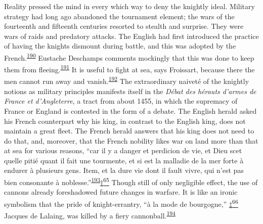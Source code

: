 Reality pressed the mind in every which way to deny the knightly ideal.
Military strategy had long ago abandoned the tournament element; the
wars of the fourteenth and fifteenth centuries resorted to stealth and
surprise. They were wars of raids and predatory attacks. The English had
first introduced the practice of having the knights dismount during
battle, and this was adopted by the
French.\textsuperscript{\protect\hypertarget{10_Chapter_Three__THE_HEROIC_DREAM.xhtmlux5cux23id_1557}{\protect\hyperlink{23_NOTES.xhtmlux5cux23id_1558}{190}}}
Eustache Deschamps comments mockingly that this was done to keep them
from
fleeing.\textsuperscript{\protect\hypertarget{10_Chapter_Three__THE_HEROIC_DREAM.xhtmlux5cux23id_1555}{\protect\hyperlink{23_NOTES.xhtmlux5cux23id_1556}{191}}}
It is useful to fight at sea, says Froissart, because there the men
cannot run away and
vanish.\textsuperscript{\protect\hypertarget{10_Chapter_Three__THE_HEROIC_DREAM.xhtmlux5cux23id_1553}{\protect\hyperlink{23_NOTES.xhtmlux5cux23id_1554}{192}}}
The extraordinary naiveté of the knightly notions as military principles
manifests itself in the \emph{Débat des hérauts d'armes de France et
d'Angleterre}, a tract from about 1455, in which the supremacy of France
or England is contested in the form of a debate. The English herald
asked his French counterpart why his king, in contrast to the English
king, does not maintain a great fleet. The French herald answers that
his king does not need to do that, and, moreover, that the French
nobility likes war on land more than that at sea for various reasons,
``car il y a danger et perdicion de vie, et Dieu scet quelle pitié quant
il fait une tourmente, et si est la malladie de la mer forte à endurer à
plusieurs gens. Item, et la dure vie dont il fault vivre, qui n'est pas
bien consonante à
noblesse.''\textsuperscript{\protect\hypertarget{10_Chapter_Three__THE_HEROIC_DREAM.xhtmlux5cux23id_1551}{\protect\hyperlink{23_NOTES.xhtmlux5cux23id_1552}{193}}}\protect\hypertarget{10_Chapter_Three__THE_HEROIC_DREAM.xhtmlux5cux23id_2917}{\protect\hyperlink{23_NOTES.xhtmlux5cux23id_2918}{†\textsuperscript{65}}}
Though still of only negligible effect, the use of cannons already
foreshadowed future changes in warfare. It is like an ironic symbolism
that the pride of knight-errantry, ``à la mode de bourgogne,''
\protect\hypertarget{10_Chapter_Three__THE_HEROIC_DREAM.xhtmlux5cux23id_2919}{\protect\hyperlink{23_NOTES.xhtmlux5cux23id_2920}{‡\textsuperscript{66}}}
Jacques de Lalaing, was killed by a fiery
cannonball.\textsuperscript{\protect\hypertarget{10_Chapter_Three__THE_HEROIC_DREAM.xhtmlux5cux23id_1549}{\protect\hyperlink{23_NOTES.xhtmlux5cux23id_1550}{194}}}

